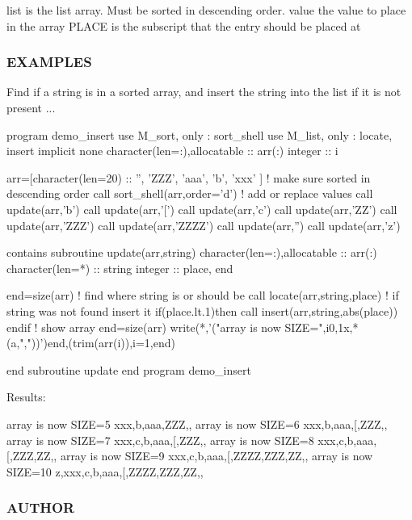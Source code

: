 \begin{DoxyVerb}list    is the list array. Must be sorted in descending order.
value   the value to place in the array
PLACE   is the subscript that the entry should be placed at
\end{DoxyVerb}


\subsubsection*{E\+X\+A\+M\+P\+L\+ES}

\begin{DoxyVerb}Find if a string is in a sorted array, and insert the string into
the list if it is not present ...

 program demo_insert
 use M_sort, only : sort_shell
 use M_list, only : locate, insert
 implicit none
 character(len=:),allocatable :: arr(:)
 integer                       :: i

 arr=[character(len=20) :: '', 'ZZZ', 'aaa', 'b', 'xxx' ]
 ! make sure sorted in descending order
 call sort_shell(arr,order='d')
 ! add or replace values
 call update(arr,'b')
 call update(arr,'[')
 call update(arr,'c')
 call update(arr,'ZZ')
 call update(arr,'ZZZ')
 call update(arr,'ZZZZ')
 call update(arr,'')
 call update(arr,'z')

 contains
 subroutine update(arr,string)
 character(len=:),allocatable :: arr(:)
 character(len=*)             :: string
 integer                      :: place, end

 end=size(arr)
 ! find where string is or should be
 call locate(arr,string,place)
 ! if string was not found insert it
 if(place.lt.1)then
    call insert(arr,string,abs(place))
 endif
 ! show array
 end=size(arr)
 write(*,'("array is now SIZE=",i0,1x,*(a,","))')end,(trim(arr(i)),i=1,end)

 end subroutine update
 end program demo_insert
\end{DoxyVerb}


Results\+:

array is now S\+I\+ZE=5 xxx,b,aaa,Z\+ZZ,, array is now S\+I\+ZE=6 xxx,b,aaa,\mbox{[},Z\+ZZ,, array is now S\+I\+ZE=7 xxx,c,b,aaa,\mbox{[},Z\+ZZ,, array is now S\+I\+ZE=8 xxx,c,b,aaa,\mbox{[},Z\+ZZ,ZZ,, array is now S\+I\+ZE=9 xxx,c,b,aaa,\mbox{[},Z\+Z\+ZZ,Z\+ZZ,ZZ,, array is now S\+I\+ZE=10 z,xxx,c,b,aaa,\mbox{[},Z\+Z\+ZZ,Z\+ZZ,ZZ,,

\subsubsection*{A\+U\+T\+H\+OR}

